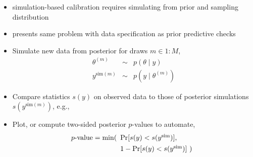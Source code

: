 \documentclass[10pt]{report}
\newcommand{\draw}[2]{#1^{(#2)}}
\newcommand{\simvar}[1]{#1^{\textrm{sim}}}
\newcommand{\simdraw}[2]{#1^{\textrm{sim}(#2)}}
\begin{document}

\begin{itemize}
\item simulation-based calibration requires simulating from prior and
  sampling distribution
\item presents same problem with data specification as prior
  predictive checks
\end{itemize}

\begin{itemize}
\item Simulate new data from posterior for draws $m \in 1{:}M$,
  \begin{eqnarray*}
    \draw{\theta}{m} & \sim & p(\theta \mid y)
    \\
    \simdraw{y}{m} & \sim & p(y \mid \draw{\theta}{m})
  \end{eqnarray*}
\item Compare statistics $s(y)$ on observed data to those
  of posterior simulations $s(\simdraw{y}{m})$, e.g.,
\item Plot, or compute two-sided posterior $p$-values to automate,
  \[
    p\textrm{-value} = \min(\begin{array}[t]{l}
                              \textrm{Pr}[s(y) < s(\simvar{y})],
                              \\[4pt]
                              1 - \textrm{Pr}[s(y) < s(\simvar{y})] \ )
                              \end{array}
  \]
\end{itemize}
\end{document}
